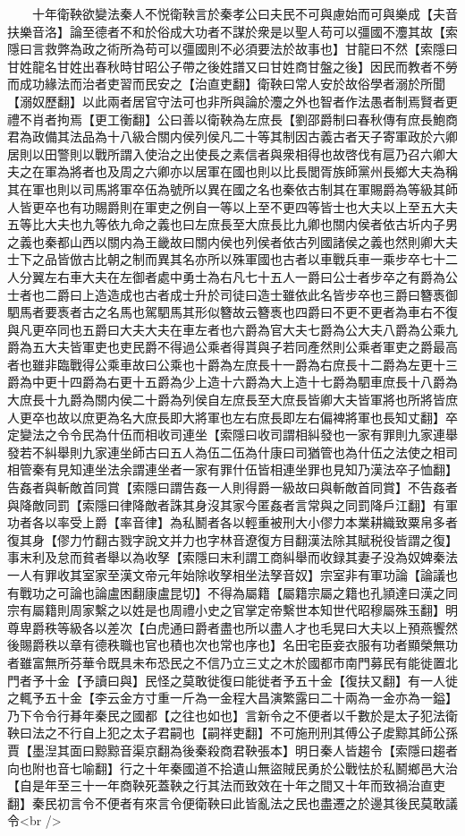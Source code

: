 　　十年衛鞅欲變法秦人不悦衛鞅言於秦孝公曰夫民不可與慮始而可與樂成【夫音扶樂音洛】論至德者不和於俗成大功者不謀於衆是以聖人苟可以彊國不灋其故【索隱曰言救弊為政之術所為苟可以彊國則不必須要法於故事也】甘龍曰不然【索隱曰甘姓龍名甘姓出春秋時甘昭公子帶之後姓譜又曰甘姓商甘盤之後】因民而教者不勞而成功緣法而治者吏習而民安之【治直吏翻】衛鞅曰常人安於故俗學者溺於所聞【溺奴歷翻】以此兩者居官守法可也非所與論於灋之外也智者作法愚者制焉賢者更禮不肖者拘焉【更工衡翻】公曰善以衛鞅為左庶長【劉邵爵制曰春秋傳有庶長鮑商君為政備其法品為十八級合關内侯列侯凡二十等其制因古義古者天子寄軍政於六卿居則以田警則以戰所謂入使治之出使長之素信者與衆相得也故啓伐有扈乃召六卿大夫之在軍為將者也及周之六卿亦以居軍在國也則以比長閭胥族師黨州長鄉大夫為稱其在軍也則以司馬將軍卒伍為號所以異在國之名也秦依古制其在軍賜爵為等級其師人皆更卒也有功賜爵則在軍吏之例自一等以上至不更四等皆士也大夫以上至五大夫五等比大夫也九等依九命之義也曰左庶長至大庶長比九卿也關内侯者依古圻内子男之義也秦都山西以關内為王畿故曰關内侯也列侯者依古列國諸侯之義也然則卿大夫士下之品皆倣古比朝之制而異其名亦所以殊軍國也古者以車戰兵車一乘步卒七十二人分翼左右車大夫在左御者處中勇士為右凡七十五人一爵曰公士者步卒之有爵為公士者也二爵曰上造造成也古者成士升於司徒曰造士雖依此名皆步卒也三爵曰簪褭御駟馬者要褭者古之名馬也駕駟馬其形似簪故云簪褭也四爵曰不更不更者為車右不復與凡更卒同也五爵曰大夫大夫在車左者也六爵為官大夫七爵為公大夫八爵為公乘九爵為五大夫皆軍吏也吏民爵不得過公乘者得貰與子若同產然則公乘者軍吏之爵最高者也雖非臨戰得公乘車故曰公乘也十爵為左庶長十一爵為右庶長十二爵為左更十三爵為中更十四爵為右更十五爵為少上造十六爵為大上造十七爵為駟車庶長十八爵為大庶長十九爵為關内侯二十爵為列侯自左庶長至大庶長皆卿大夫皆軍將也所將皆庶人更卒也故以庶更為名大庶長即大將軍也左右庶長即左右偏裨將軍也長知丈翻】卒定變法之令令民為什伍而相收司連坐【索隱曰收司謂相糾發也一家有罪則九家連舉發若不糾舉則九家連坐師古曰五人為伍二伍為什康曰司猶管也為什伍之法使之相司相管秦有見知連坐法余謂連坐者一家有罪什伍皆相連坐罪也見知乃漢法卒子恤翻】告姦者與斬敵首同賞【索隱曰謂告姦一人則得爵一級故曰與斬敵首同賞】不告姦者與降敵同罰【索隱曰律降敵者誅其身沒其家今匿姦者言常與之同罰降戶江翻】有軍功者各以率受上爵【率音律】為私鬭者各以輕重被刑大小僇力本業耕織致粟帛多者復其身【僇力竹翻古戮字說文并力也字林音遼復方目翻漢法除其賦税役皆謂之復】事末利及怠而貧者舉以為收孥【索隱曰末利謂工商糾舉而收録其妻子没為奴婢秦法一人有罪收其室家至漢文帝元年始除收孥相坐法孥音奴】宗室非有軍功論【論議也有戰功之可論也論盧困翻康盧昆切】不得為屬籍【屬籍宗屬之籍也孔頴達曰漢之同宗有屬籍則周家繫之以姓是也周禮小史之官掌定帝繫世本知世代昭穆屬殊玉翻】明尊卑爵秩等級各以差次【白虎通曰爵者盡也所以盡人才也毛晃曰大夫以上預燕饗然後賜爵秩以章有德秩職也官也積也次也常也序也】名田宅臣妾衣服有功者顯榮無功者雖富無所芬華令既具未布恐民之不信乃立三丈之木於國都市南門募民有能徙置北門者予十金【予讀曰與】民怪之莫敢徙復曰能徙者予五十金【復扶又翻】有一人徙之輒予五十金【李云金方寸重一斤為一金程大昌演繁露曰二十兩為一金亦為一鎰】乃下令令行朞年秦民之國都【之往也如也】言新令之不便者以千數於是太子犯法衛鞅曰法之不行自上犯之太子君嗣也【嗣祥吏翻】不可施刑刑其傅公子䖍黥其師公孫賈【墨湼其面曰黥黥音渠京翻為後秦殺商君鞅張本】明日秦人皆趨令【索隱曰趨者向也附也音七喻翻】行之十年秦國道不拾遺山無盜賊民勇於公戰怯於私鬭鄉邑大治【自是年至三十一年商鞅死蓋鞅之行其法而致效在十年之間又十年而致禍治直吏翻】秦民初言令不便者有來言令便衛鞅曰此皆亂法之民也盡遷之於邊其後民莫敢議令<br />
